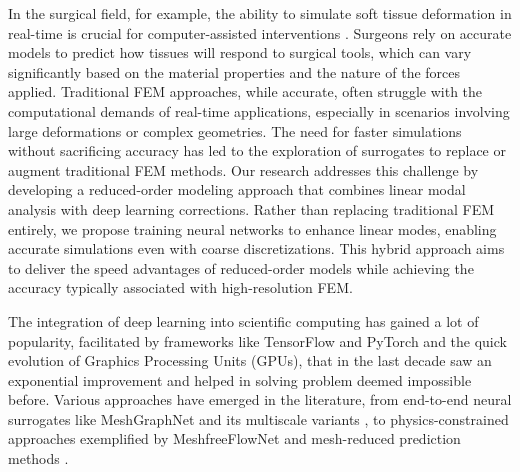 In the surgical field, for example, the ability to simulate soft tissue deformation in real-time is crucial for computer-assisted interventions \cite{petit:hal-01930366}. Surgeons rely on accurate models to predict how tissues will respond to surgical tools, which can vary significantly based on the material properties and the nature of the forces applied. Traditional FEM approaches, while accurate, often struggle with the computational demands of real-time applications, especially in scenarios involving large deformations or complex geometries. The need for faster simulations without sacrificing accuracy has led to the exploration of surrogates to replace or augment traditional FEM methods. 
Our research addresses this challenge by developing a reduced-order modeling approach that combines linear modal analysis with deep learning corrections. Rather than replacing traditional FEM entirely, we propose training neural networks to enhance linear modes, enabling accurate simulations even with coarse discretizations. This hybrid approach aims to deliver the speed advantages of reduced-order models while achieving the accuracy typically associated with high-resolution FEM.


The integration of deep learning into scientific computing has gained a lot of popularity, facilitated by frameworks like TensorFlow \cite{tensorflow2015-whitepaper} and PyTorch \cite{paszke2019pytorchimperativestylehighperformance} and the quick evolution of Graphics Processing Units (GPUs), that in the last decade saw an exponential improvement and helped in solving problem deemed impossible before. Various approaches have emerged in the literature, from end-to-end neural surrogates like MeshGraphNet \cite{pfaffLearningMeshBasedSimulation2021a} and its multiscale variants \cite{fortunatoMultiScaleMeshGraphNets2022}, to physics-constrained approaches exemplified by MeshfreeFlowNet \cite{jiangMeshfreeFlowNetPhysicsConstrainedDeep2020} and mesh-reduced prediction methods \cite{hanPredictingPhysicsMeshreduced2022a}.


